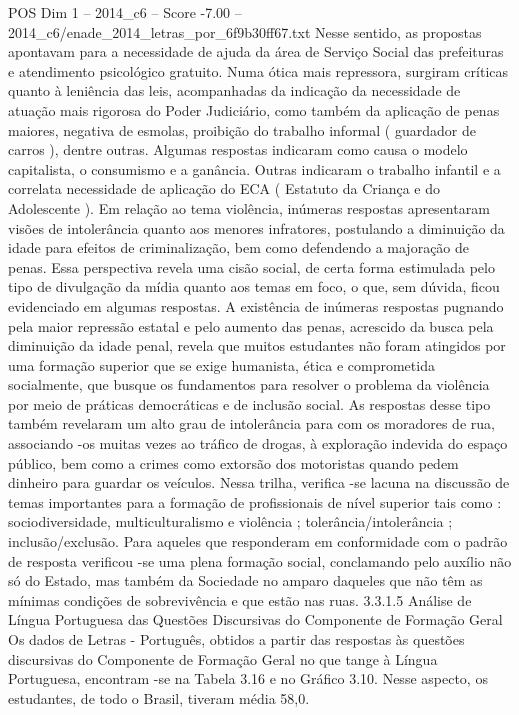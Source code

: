 \begin{textsample}{POS Dim 1 – 2014\_c6 – Score -7.00 – 2014\_c6/enade\_2014\_letras\_por\_6f9b30ff67.txt}
Nesse sentido, as propostas apontavam para a necessidade de ajuda da área de Serviço Social das prefeituras e atendimento psicológico gratuito.
Numa ótica mais repressora, surgiram críticas quanto à leniência das leis, acompanhadas da indicação da necessidade de atuação mais rigorosa do Poder Judiciário, como também da aplicação de penas maiores, negativa de esmolas, proibição do trabalho informal ( guardador de carros ), dentre outras.
Algumas respostas indicaram como causa o modelo capitalista, o consumismo e a ganância.
Outras indicaram o trabalho infantil e a correlata necessidade de aplicação do ECA ( Estatuto da Criança e do Adolescente ).
Em relação ao tema violência, inúmeras respostas apresentaram visões de intolerância quanto aos menores infratores, postulando a diminuição da idade para efeitos de criminalização, bem como defendendo a majoração de penas.
Essa perspectiva revela uma cisão social, de certa forma estimulada pelo tipo de divulgação da mídia quanto aos temas em foco, o que, sem dúvida, ficou evidenciado em algumas respostas.
A existência de inúmeras respostas pugnando pela maior repressão estatal e pelo aumento das penas, acrescido da busca pela diminuição da idade penal, revela que muitos estudantes não foram atingidos por uma formação superior que se exige humanista, ética e comprometida socialmente, que busque os fundamentos para resolver o problema da violência por meio de práticas democráticas e de inclusão social.
As respostas desse tipo também revelaram um alto grau de intolerância para com os moradores de rua, associando -os muitas vezes ao tráfico de drogas, à exploração indevida do espaço público, bem como a crimes como extorsão dos motoristas quando pedem dinheiro para guardar os veículos.
Nessa trilha, verifica -se lacuna na discussão de temas importantes para a formação de profissionais de nível superior tais como : sociodiversidade, multiculturalismo e violência ; tolerância/intolerância ; inclusão/exclusão.
Para aqueles que responderam em conformidade com o padrão de resposta verificou -se uma plena formação social, conclamando pelo auxílio não só do Estado, mas também da Sociedade no amparo daqueles que não têm as mínimas condições de sobrevivência e que estão nas ruas. 3.3.1.5 Análise de Língua Portuguesa das Questões Discursivas do Componente de Formação Geral Os dados de Letras - Português, obtidos a partir das respostas às questões discursivas do Componente de Formação Geral no que tange à Língua Portuguesa, encontram -se na Tabela 3.16 e no Gráfico 3.10.
Nesse aspecto, os estudantes, de todo o Brasil, tiveram média 58,0.

\end{textsample}
